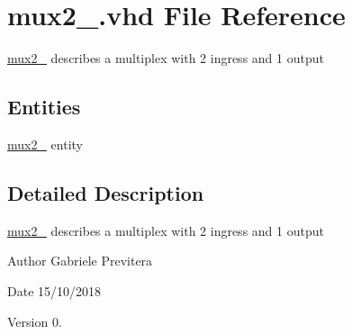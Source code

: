 \hypertarget{mux2__1_8vhd}{}\section{mux2\+\_.\+vhd File Reference}
\label{mux2__1_8vhd}


\hyperlink{classmux2__1}{mux2\+\_} describes a multiplex with 2 ingress and 1 output  


\subsection*{Entities}
\begin{DoxyCompactItemize}
\item 
\hyperlink{classmux2__1}{mux2\+\_} entity
\end{DoxyCompactItemize}


\subsection{Detailed Description}
\hyperlink{classmux2__1}{mux2\+\_} describes a multiplex with 2 ingress and 1 output 

\begin{DoxyAuthor}{Author}
Gabriele Previtera 
\end{DoxyAuthor}
\begin{DoxyDate}{Date}
15/10/2018 
\end{DoxyDate}
\begin{DoxyVersion}{Version}
0. 
\end{DoxyVersion}
